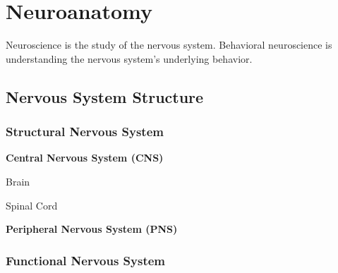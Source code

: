 \section{Neuroanatomy}

Neuroscience is the study of the nervous system. Behavioral neuroscience is understanding the nervous system's underlying behavior.

\subsection{Nervous System Structure}

\subsubsection{Structural Nervous System}


\begin{coloredlist}
    \item \textbf{Central Nervous System (CNS)}
    \begin{coloredlist}
        \item Brain
        \item Spinal Cord
    \end{coloredlist}
    \item \textbf{Peripheral Nervous System (PNS)}

\end{coloredlist}

\subsubsection{Functional Nervous System}


